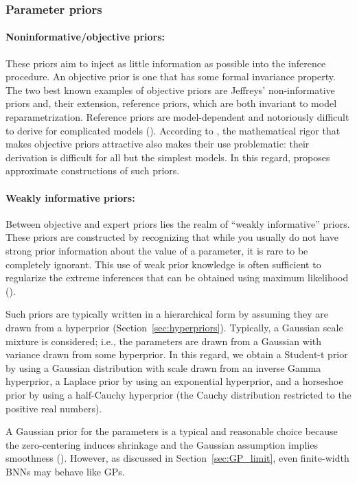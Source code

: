 \subsubsection{Parameter priors}

\paragraph{Noninformative/objective priors:} These priors aim to inject as little information as possible into the inference procedure. 
An objective prior is one that has some formal invariance property. 
The two best known examples of objective priors are Jeffreys' non-informative priors and, their extension, reference priors, which are both invariant to model reparametrization.
Reference priors are model-dependent and notoriously difficult to derive for complicated models (\cite{simpson2015penalising}). 
According to \textcite{nalisnick2018priors}, the mathematical rigor that makes objective priors attractive also makes their use problematic: their derivation is difficult for all but the simplest models. 
In this regard, \textcite{nalisnick2018priors} proposes approximate constructions of such priors. 

\paragraph{Weakly informative priors:} Between objective and expert priors lies the realm of ``weakly informative'' priors. 
These priors are constructed by recognizing that while you usually do not have strong prior information about the value of a parameter, it is rare to be completely ignorant. 
This use of weak prior knowledge is often sufficient to regularize the extreme inferences that can be obtained using maximum likelihood (\cite{simpson2015penalising}).

Such priors are typically written in a hierarchical form by assuming they are drawn from a hyperprior (Section~\ref{sec:hyperpriors}). 
Typically, a Gaussian scale mixture is considered; i.e., the parameters are drawn from a Gaussian with variance drawn from some hyperprior. 
In this regard, we obtain a Student-t prior by using a Gaussian distribution with scale drawn from an inverse Gamma hyperprior, a Laplace prior by using an exponential hyperprior, and a horseshoe prior by using a half-Cauchy hyperprior (the Cauchy distribution restricted to the positive real numbers). 

A Gaussian prior for the parameters is a typical and reasonable choice because the zero-centering induces shrinkage and the Gaussian assumption implies smoothness (\cite{nalisnick2018priors}). 
However, as discussed in Section~\ref{sec:GP_limit}, even finite-width BNNs may behave like GPs. 

